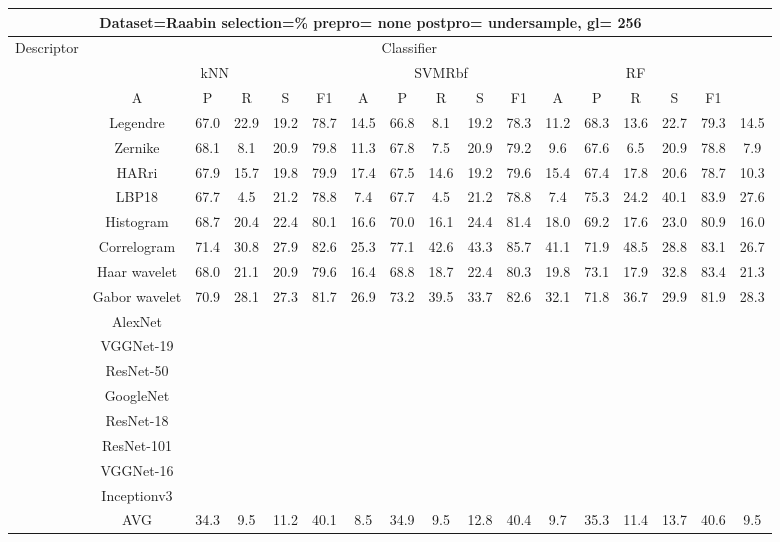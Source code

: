 \documentclass[12pt,italian]{article}
\begin{document}
\begin{tiny}
\begin{longtable}{lcccccccccccccccc}
\toprule
\multicolumn{16}{c}{Dataset=Raabin selection=\% prepro= none postpro= undersample, gl= 256} \\ 
\toprule
Descriptor & \multicolumn{15}{c}{Classifier} \\ 
& \multicolumn{5}{c}{kNN} & \multicolumn{5}{c}{SVMRbf} & \multicolumn{5}{c}{RF} \\ 
& A & P & R & S & F1 & A & P & R & S & F1 & A & P & R & S & F1 \\ 
\midrule
& Legendre & 67.0 & 22.9 & 19.2 & 78.7 & 14.5 & 66.8 &  8.1 & 19.2 & 78.3 & 11.2 & 68.3 & 13.6 & 22.7 & 79.3 & 14.5 \\ 
& Zernike & 68.1 &  8.1 & 20.9 & 79.8 & 11.3 & 67.8 &  7.5 & 20.9 & 79.2 &  9.6 & 67.6 &  6.5 & 20.9 & 78.8 &  7.9 \\ 
& HARri & 67.9 & 15.7 & 19.8 & 79.9 & 17.4 & 67.5 & 14.6 & 19.2 & 79.6 & 15.4 & 67.4 & 17.8 & 20.6 & 78.7 & 10.3 \\ 
& LBP18 & 67.7 &  4.5 & 21.2 & 78.8 &  7.4 & 67.7 &  4.5 & 21.2 & 78.8 &  7.4 & 75.3 & 24.2 & 40.1 & 83.9 & 27.6 \\ 
& Histogram & 68.7 & 20.4 & 22.4 & 80.1 & 16.6 & 70.0 & 16.1 & 24.4 & 81.4 & 18.0 & 69.2 & 17.6 & 23.0 & 80.9 & 16.0 \\ 
& Correlogram & 71.4 & 30.8 & 27.9 & 82.6 & 25.3 & 77.1 & 42.6 & 43.3 & 85.7 & 41.1 & 71.9 & 48.5 & 28.8 & 83.1 & 26.7 \\ 
& Haar wavelet & 68.0 & 21.1 & 20.9 & 79.6 & 16.4 & 68.8 & 18.7 & 22.4 & 80.3 & 19.8 & 73.1 & 17.9 & 32.8 & 83.4 & 21.3 \\ 
& Gabor wavelet & 70.9 & 28.1 & 27.3 & 81.7 & 26.9 & 73.2 & 39.5 & 33.7 & 82.6 & 32.1 & 71.8 & 36.7 & 29.9 & 81.9 & 28.3 \\ 
& AlexNet \\ 
& VGGNet-19 \\ 
& ResNet-50 \\ 
& GoogleNet \\ 
& ResNet-18 \\ 
& ResNet-101 \\ 
& VGGNet-16 \\ 
& Inceptionv3 \\ 
\hline
& AVG & 34.3 &  9.5 & 11.2 & 40.1 &  8.5 & 34.9 &  9.5 & 12.8 & 40.4 &  9.7 & 35.3 & 11.4 & 13.7 & 40.6 &  9.5 \\ 
\hline
\bottomrule
\end{longtable} 


\end{tiny}
\end{document}
